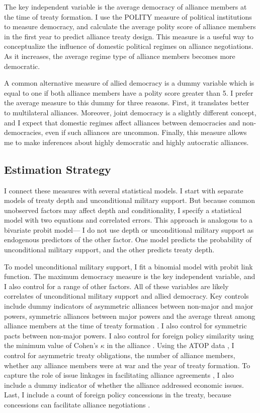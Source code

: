 \documentclass[12pt]{article}
\begin{document}
The key independent variable is the average democracy of alliance members at the time of treaty formation. 
I use the POLITY measure of political institutions to measure democracy, and calculate the average polity score of alliance members in the first year to predict alliance treaty design. 
This measure is a useful way to conceptualize the influence of domestic political regimes on alliance negotiations. 
As it increases, the average regime type of alliance members becomes more democratic. 


A common alternative measure of allied democracy is a dummy variable which is equal to one if both alliance members have a polity score greater than 5. 
I prefer the average measure to this dummy for three reasons.
First, it translates better to multilateral alliances. 
Moreover, joint democracy is a slightly different concept, and I expect that domestic regimes affect alliances between democracies and non-democracies, even if such alliances are uncommon.
Finally, this measure allows me to make inferences about highly democratic and highly autocratic alliances. 



\subsection{Estimation Strategy}

I connect these measures with several statistical models. 
I start with separate models of treaty depth and unconditional military support. 
But because common unobserved factors may affect depth and conditionality, I specify a statistical model with two equations and correlated errors.
This approach is analogous to a bivariate probit model--- I do not use depth or unconditional military support as endogenous predictors of the other factor. 
One model predicts the probability of unconditional military support, and the other predicts treaty depth.


To model unconditional military support, I fit a binomial model with probit link function. 
The maximum democracy measure is the key independent variable, and I also control for a range of other factors.
All of these variables are likely correlates of unconditional military support and allied democracy. 
Key controls include dummy indicators of asymmetric alliances between non-major and major powers, symmetric alliances between major powers \citep{Mattes2012} and the average threat among alliance members at the time of treaty formation \citep{LeedsSavun2007}. 
I also control for symmetric pacts between non-major powers. 
I also control for foreign policy similarity \citep{Benson2012} using the minimum value of Cohen's $\kappa$ in the alliance \citep{Hage2011}.
Using the ATOP data \citep{Leedsetal2002}, I control for asymmetric treaty obligations, the number of alliance members, whether any alliance members were at war and the year of treaty formation. 
To capture the role of issue linkages in facilitating alliance agreements \citep{Poast2012, Poast2013}, I also include a dummy indicator of whether the alliance addressed economic issues.  
Last, I include a count of foreign policy concessions in the treaty, because concessions can facilitate alliance negotiations \citep{Johnson2015}. 
\end{document}
